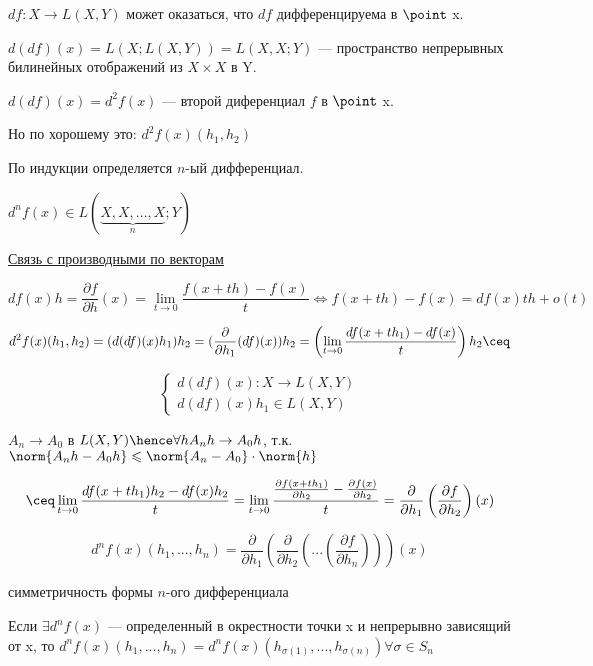 \begin{enumerate}
    $df : X \to L(X, Y)$ может оказаться, что $df$ дифференцируема в $\point$ x.

    $d(df)(x) = L(X; L(X, Y)) = L(X, X ; Y)$ --- пространство непрерывных билинейных отображений из $X \times X $ в Y.
    
    $d(df)(x) = d^2 f(x)$ --- второй диференциал $f$ в $\point$ x.

    Но по хорошему это: $d^2 f(x) (h_1, h_2)$

    По индукции определяется $n$-ый дифференциал.

    $d ^ n f(x) \in L(\underbrace{X, X, ... , X}_{n}; Y)$


    \underline{Связь с производными по векторам}

    \[
        df(x) h = \frac{\partial f}{\partial h}(x) = \lim_{t \to 0} \frac{f(x + th) - f(x)}{t} \Longleftrightarrow  f(x + th) - f(x) = df(x) th + o(t)
    \]

    \[
        d ^ 2 f(x) (h_1, h_2) = (d(df) (x) h_1) h_2 = (\frac{\partial}{\partial h_1} (df)(x)) h_2 = \left(\lim_{t \to 0} \frac{df(x + th_1) - df(x)}{t} \right) h_2 \ceq
    \]

    \[
        \begin{cases}
            d(df)(x) : X \to L(X, Y)\\
            d(df)(x)h_1 \in L(X, Y)
        \end{cases}
    \] 

    \begin{remark}
        $A_n \to A_0$ в $L(X, Y) \hence \forall h A_n h \to A_0 h $, т.к. $\norm{A_n h - A_0 h} \leqslant \norm{A_n - A_0} \cdot \norm{h}$
    \end{remark}

    \[
        \ceq \lim_{t \to 0} \frac{df(x + th_1) h_2 - df(x)h_2}{t} = \lim_{t \to 0} \frac{\frac{\partial f(x + th_1)}{\partial h_2} - \frac{\partial f(x)}{\partial h_2}}{t} = \frac{\partial}{\partial h_1} \left(\frac{\partial f}{\partial h_2} \right) (x)
    \]

    \[
        d ^ n f(x) (h_1, ..., h_n) = \frac{\partial }{\partial h_1} \left( \frac{\partial}{\partial h_2} \left(... \left(\frac{\partial f}{\partial h_n} \right)\right) \right)(x)
    \]

    \begin{namedtheorem}{симметричность формы $n$-ого дифференциала}
        
        Если $\exists d^n f(x)$ --- определенный в окрестности точки x и непрерывно зависящий от x, то $d^n f(x)(h_1, ..., h_n) = d^n f(x) (h_{\sigma(1)}, ..., h_{\sigma(n)}) \forall \sigma \in S_n$ 
    \end{namedtheorem}


\end{enumerate}
